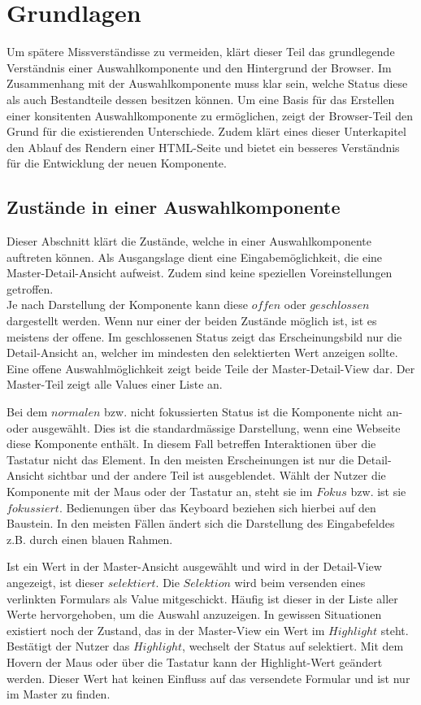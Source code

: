 \chapter{Grundlagen}

Um spätere Missverständisse zu vermeiden, klärt dieser Teil das grundlegende Verständnis einer Auswahlkomponente und den Hintergrund der Browser.
Im Zusammenhang mit der Auswahlkomponente muss klar sein, welche Status diese als auch Bestandteile dessen besitzen können.
Um eine Basis für das Erstellen einer konsitenten Auswahlkomponente zu ermöglichen, zeigt der Browser-Teil den Grund für die existierenden Unterschiede.
Zudem klärt eines dieser Unterkapitel den Ablauf des Rendern einer HTML-Seite und bietet ein besseres Verständnis für die Entwicklung der neuen Komponente.


\section{Zustände in einer Auswahlkomponente}

Dieser Abschnitt klärt die Zustände, welche in einer Auswahlkomponente auftreten können.
Als Ausgangslage dient eine Eingabemöglichkeit, die eine Master-Detail-Ansicht aufweist.
Zudem sind keine speziellen Voreinstellungen getroffen.
\\
Je nach Darstellung der Komponente kann diese $offen$ oder $geschlossen$ dargestellt werden.
Wenn nur einer der beiden Zustände möglich ist, ist es meistens der offene.
Im geschlossenen Status zeigt das Erscheinungsbild nur die Detail-Ansicht an, welcher im mindesten den selektierten Wert anzeigen sollte.
Eine offene Auswahlmöglichkeit zeigt beide Teile der Master-Detail-View dar.
Der Master-Teil zeigt alle Values einer Liste an.

Bei dem $normalen$ bzw. nicht fokussierten Status ist die Komponente nicht an- oder ausgewählt.
Dies ist die standardmässige Darstellung, wenn eine Webseite diese Komponente enthält.
In diesem Fall betreffen Interaktionen über die Tastatur nicht das Element.
In den meisten Erscheinungen ist nur die Detail-Ansicht sichtbar und der andere Teil ist ausgeblendet.
Wählt der Nutzer die Komponente mit der Maus oder der Tastatur an, steht sie im $Fokus$ bzw. ist sie $fokussiert$.
Bedienungen über das Keyboard beziehen sich hierbei auf den Baustein.
In den meisten Fällen ändert sich die Darstellung des Eingabefeldes z.B. durch einen blauen Rahmen.

Ist ein Wert in der Master-Ansicht ausgewählt und wird in der Detail-View angezeigt, ist dieser $selektiert$.
Die $Selektion$ wird beim versenden eines verlinkten Formulars als Value mitgeschickt.
Häufig ist dieser in der Liste aller Werte hervorgehoben, um die Auswahl anzuzeigen.
In gewissen Situationen existiert noch der Zustand, das in der Master-View ein Wert im $Highlight$ steht. 
Bestätigt der Nutzer das $Highlight$, wechselt der Status auf selektiert.
Mit dem Hovern der Maus oder über die Tastatur kann der Highlight-Wert geändert werden.
Dieser Wert hat keinen Einfluss auf das versendete Formular und ist nur im Master zu finden.

